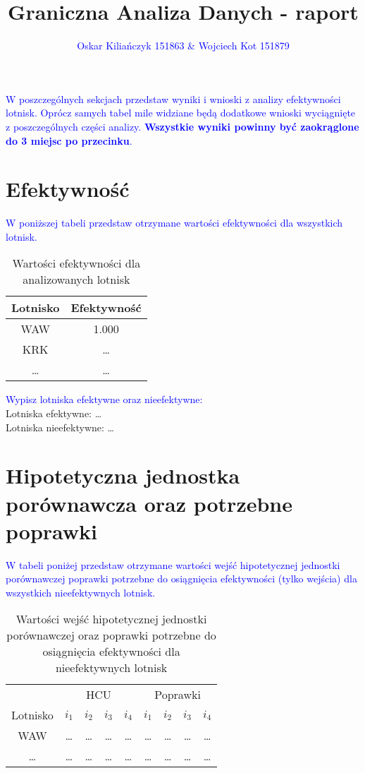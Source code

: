 \documentclass[a4paper,12pt]{article}
\author{\textcolor{blue}{Oskar Kiliańczyk 151863 \& Wojciech Kot 151879}}
\date{}
\title{Graniczna Analiza Danych - raport}
\begin{document}
\maketitle

\textcolor{blue}{W poszczególnych sekcjach przedstaw wyniki i wnioski z analizy efektywności lotnisk. Oprócz samych tabel mile widziane będą dodatkowe wnioski wyciągnięte z poszczególnych części analizy. \textbf{Wszystkie wyniki powinny być zaokrąglone do 3 miejsc po przecinku}.}

\section{Efektywność}
\textcolor{blue}{W poniższej tabeli przedstaw otrzymane wartości efektywności dla wszystkich lotnisk.}
\begin{table}[H]
    \centering
    \begin{tabular}{c|c}
    \hline
         Lotnisko & Efektywność  \\ \hline
         WAW & 1.000 \\
         KRK & \ldots \\
         \ldots & \ldots \\
         \hline
    \end{tabular}
    \caption{Wartości efektywności dla analizowanych lotnisk}
    \label{tab:airports-efficiency}
\end{table}

\noindent \textcolor{blue}{Wypisz lotniska efektywne oraz nieefektywne:} \\
Lotniska efektywne: \ldots \\
Lotniska nieefektywne: \ldots

\section{Hipotetyczna jednostka porównawcza oraz potrzebne poprawki}

\textcolor{blue}{W tabeli poniżej przedstaw otrzymane wartości wejść hipotetycznej jednostki porównawczej poprawki potrzebne do osiągnięcia efektywności (tylko wejścia) dla wszystkich nieefektywnych lotnisk.}

\begin{table}[H]
    \centering
    \begin{tabular}{c|cccc|cccc}
    \hline
        & \multicolumn{4}{c|}{HCU} & \multicolumn{4}{c}{Poprawki}  \\
         Lotnisko & $i_1$ & $i_2$ & $i_3$ & $i_4$ & $i_1$ & $i_2$ & $i_3$ & $i_4$ \\ \hline
         WAW & \ldots & \ldots & \ldots & \ldots & \ldots & \ldots & \ldots & \ldots \\
         \ldots & \ldots & \ldots & \ldots & \ldots & \ldots & \ldots & \ldots & \ldots \\
    \end{tabular}
    \caption{Wartości wejść hipotetycznej jednostki porównawczej oraz poprawki potrzebne do osiągnięcia efektywności dla nieefektywnych lotnisk }
    \label{tab:airports-hcu-and-improvements}
\end{table}
\end{document}
